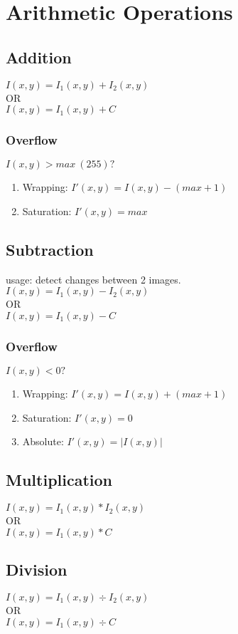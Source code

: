 \section{Arithmetic Operations}
\subsection{Addition}
$I(x,y) = I_1(x,y) + I_2(x,y)$\\
OR\\
$I(x,y) = I_1(x,y) + C$\\
\subsubsection{Overflow}
$I(x,y) > max\ (255)?$
\begin{enumerate}
  \item Wrapping: $I'(x,y) = I(x,y) - (max+1)$
  \item Saturation: $ I'(x,y) = max$
\end{enumerate}

\subsection{Subtraction}
usage: detect changes between 2 images.\\
$I(x,y) = I_1(x,y) - I_2(x,y)$\\
OR\\
$I(x,y) = I_1(x,y) - C$\\
\subsubsection{Overflow}
$I(x,y) < 0?$
\begin{enumerate}
  \item Wrapping: $I'(x,y) = I(x,y) + (max+1)$
  \item Saturation: $ I'(x,y) = 0$
  \item Absolute: $ I'(x,y) = |I(x,y)|$
\end{enumerate}
\subsection{Multiplication}
$I(x,y) = I_1(x,y) * I_2(x,y)$\\
OR\\
$I(x,y) = I_1(x,y) * C$\\
\subsection{Division}
$I(x,y) = I_1(x,y) \div I_2(x,y)$\\
OR\\
$I(x,y) = I_1(x,y) \div C$\\
